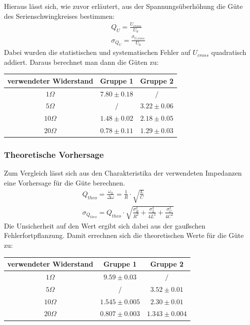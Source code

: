 \documentclass[a4paper, 11pt]{article}
\begin{document}
Hieraus lässt sich, wie zuvor erläutert, aus der Spannungsüberhöhung die Güte des Serienschwingkreises bestimmen:
\begin{eqnarray*}
Q_U = \frac{U_{cross}}{U_0}	\\
\sigma_{Q_U} = \frac{\sigma_{U_cross}}{U_0}
\end{eqnarray*}
Dabei wurden die statistischen und systematischen Fehler auf $U_{cross}$ quadratisch addiert.
Daraus berechnet man dann die Güten zu:
\begin{center}
\renewcommand{\arraystretch}{1.5}
\begin{tabular}{|c|c|c|}
\hline verwendeter Widerstand	& Gruppe 1	& Gruppe 2	\\
\hline $  1 \Omega $		&	$ 7.80 \pm 0.18 $	&	$ / $ 	\\
\hline $  5 \Omega $		&	$ / $	&	$ 3.22 \pm 0.06 $	\\
\hline $ 10 \Omega $		&	$ 1.48 \pm 0.02 $	&	$ 2.18 \pm 0.05$	\\
\hline $ 20 \Omega $		&	$ 0.78 \pm 0.11 $	&	$ 1.29 \pm 0.03$	\\
\hline
\end{tabular}
\end{center}


\subsubsection{Theoretische Vorhersage}
Zum Vergleich lässt sich aus den Charakteristika der verwendeten Impedanzen eine Vorhersage für die Güte berechnen.
\begin{eqnarray*}
Q_{theo} = \frac{\omega_0}{\Delta \omega} = \frac{1}{R} \cdot \sqrt{\frac{L}{C}} \\
\sigma_{Q_{theo}} = Q_{theo} \cdot \sqrt{\frac{\sigma_R^2}{R^2} + \frac{\sigma_L^2}{4L^2} + \frac{\sigma_C^2}{4C^2}}
\end{eqnarray*}
Die Unsicherheit auf den Wert ergibt sich dabei aus der gaußschen Fehlerfortpflanzung. Damit errechnen sich die theoretischen Werte für die Güte zu:

\begin{center}
\renewcommand{\arraystretch}{1.5}
\begin{tabular}{|c|c|c|}
\hline verwendeter Widerstand	&	Gruppe 1	&	Gruppe 2 \\
\hline $  1 \Omega $		&	$ 9.59 \pm 0.03$	&	$ / $ 	\\
\hline $  5 \Omega $		&	$ / $	&	$ 3.52 \pm 0.01$ 	\\
\hline $ 10 \Omega $		&	$ 1.545 \pm 0.005$	&	$ 2.30 \pm 0.01$ 	\\
\hline $ 20 \Omega $		&	$ 0.807 \pm 0.003$	&	$ 1.343 \pm 0.004$ 	\\
\hline
\end{tabular}
\end{center}
\end{document}

